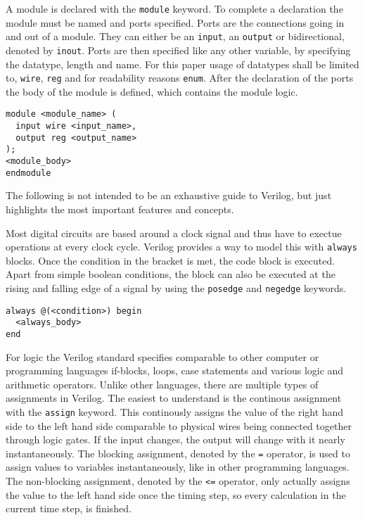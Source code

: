 A module is declared with the \texttt{module} keyword. To complete a declaration the module must be named and ports specified. Ports are the connections going in and out of a module. They can either be an \texttt{input}, an \texttt{output} or bidirectional, denoted by \texttt{inout}. Ports are then specified like any other variable, by specifying the datatype, length and name. For this paper usage of datatypes shall be limited to, \texttt{wire}, \texttt{reg} and for readability reasons \texttt{enum}. After the declaration of the ports the body of the module is defined, which contains the module logic.
\begin{lstlisting}
module <module_name> (
  input wire <input_name>,
  output reg <output_name>
);
<module_body>
endmodule
\end{lstlisting}

The following is not intended to be an exhaustive guide to Verilog, but just highlights the most important features and concepts. 

Most digital circuits are based around a clock signal and thus have to exectue operations at every clock cycle. Verilog provides a way to model this with \texttt{always} blocks. Once the condition in the bracket is met, the code block is executed. Apart from simple boolean conditions, the block can also be executed at the rising and falling edge of a signal by using the \texttt{posedge} and \texttt{negedge} keywords.

\begin{lstlisting}
always @(<condition>) begin
  <always_body>
end

\end{lstlisting}

For logic the Verilog standard specifies comparable to other computer or programming languages if-blocks, loops, case statements and various logic and arithmetic operators. Unlike other languages, there are multiple types of assignments in Verilog. The easiest to understand is the continous assignment with the \texttt{assign} keyword. This continously assigns the value of the right hand side to the left hand side comparable to physical wires being connected together through logic gates. If the input changes, the output will change with it nearly instantaneously. The blocking assignment, denoted by the \texttt{=} operator, is used to assign values to variables instantaneously, like in other programming languages. The non-blocking assignment, denoted by the \texttt{<=} operator, only actually assigns the value to the left hand side once the timing step, so every calculation in the current time step, is finished. 

